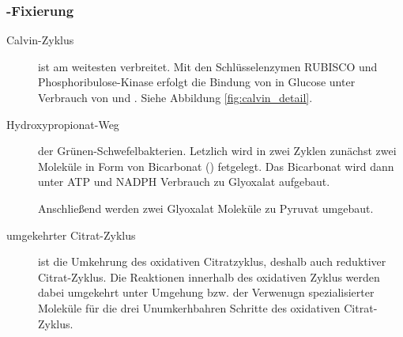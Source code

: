 \subsubsection{-Fixierung}
\begin{description}
	\item[Calvin-Zyklus] ist am weitesten verbreitet.
		Mit den Schlüsselenzymen RUBISCO und Phosphoribulose-Kinase
		erfolgt die Bindung von  in Glucose
		unter Verbrauch von  und .
		Siehe Abbildung \ref{fig:calvin_detail}.

	\item[Hydroxypropionat-Weg] der Grünen-Schwefelbakterien.
		Letzlich wird in zwei Zyklen zunächst zwei Moleküle 
		in Form von Bicarbonat () fetgelegt.
		Das Bicarbonat wird dann unter ATP und NADPH Verbrauch zu Glyoxalat aufgebaut.

		Anschließend werden zwei Glyoxalat Moleküle zu Pyruvat umgebaut.

	\item[umgekehrter Citrat-Zyklus] ist die Umkehrung des oxidativen Citratzyklus,
		deshalb auch reduktiver Citrat-Zyklus.
		Die Reaktionen innerhalb des oxidativen Zyklus werden dabei umgekehrt
		unter Umgehung bzw. der Verwenugn spezialisierter Moleküle für die 
		drei Unumkerhbahren Schritte des oxidativen Citrat-Zyklus.

\end{description}
